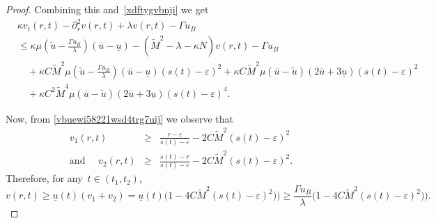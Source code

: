 \documentclass[12pt,a4paper,intlimits,sumlimits]{amsart}
\theoremstyle{definition}
\theoremstyle{plain}
\numberwithin{equation}{section}
\renewcommand{\le}{\leqslant}
\renewcommand{\geq}{\geqslant}
\begin{document}
\begin{proof}
Combining this and~\eqref{xdftygvbnji} we get
\begin{equation}\label{xdftygvbnji5}
\begin{split}&
\kappa v_t(r,t)-\partial^2_r v(r,t)+\lambda v(r,t)-\Gamma u_B \\
&\le  \kappa\mu\left(\widetilde u-\frac{\Gamma u_B}{\lambda} \right)(\overline{u}- \underline{u})
-(\widetilde M^2-\lambda-\kappa\overline{N})v(r,t)
-\Gamma u_B \\
&\quad+\kappa C\widetilde M^2 \mu\left(\widetilde u-\frac{\Gamma u_B}{\lambda} \right)(\overline u-\underline u)(s(t)-\varepsilon)^2
+\kappa C\widetilde M^2 \mu (\overline u-\widetilde u)(2\overline u+3\underline u)(s(t)-\varepsilon)^2 \\
&\quad +\kappa C^2 \widetilde M^4\mu(\overline u-\widetilde u)(2\overline u+3\underline u)(s(t)-\varepsilon)^4.
\end{split}
\end{equation}

Now, from \eqref{vbuewi58221wsd4trg7uij} we observe that
\begin{eqnarray*}%
v_1(r,t)&\geq &\frac{r-\varepsilon}{s(t)-\varepsilon}-2C\widetilde M^2(s(t)-\varepsilon)^2\\
{\mbox{and }}\quad
v_2(r,t)&\geq &\frac{s(t)-r}{s(t)-\varepsilon}-2C\widetilde M^2(s(t)-\varepsilon)^2.
\end{eqnarray*}
Therefore, for any~$t\in(t_1,t_2)$,
\begin{equation}\label{8765jhgfdhgfd765436543} v(r,t)\geq \underline{u}(t)(v_1+v_2)=\underline{u}(t)\big(1-4C\widetilde M^2(s(t)-\varepsilon)^2)\big)
\geq \frac{\Gamma u_B}{\lambda}\big(1-4C\widetilde M^2(s(t)-\varepsilon)^2)\big).
\end{equation}


\end{proof}
\end{document}
